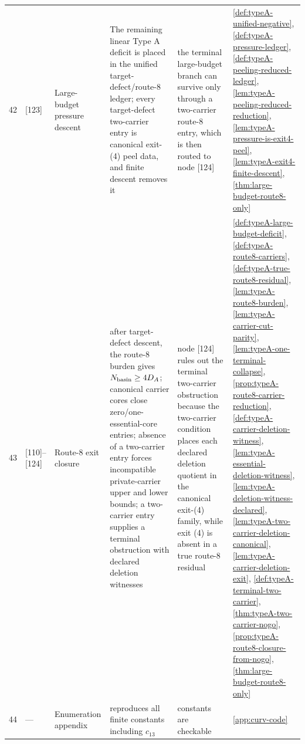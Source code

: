 \documentclass[11pt]{article}
\begin{document}
{\begin{longtable}{C{0.04\textwidth} L{0.13\textwidth} L{0.17\textwidth} L{0.25\textwidth} L{0.21\textwidth} L{0.12\textwidth}}
42 & [123] & Large-budget pressure descent & The remaining linear Type A deficit is placed in the unified target-defect/route-8 ledger; every target-defect two-carrier entry is canonical exit-(4) peel data, and finite descent removes it & the terminal large-budget branch can survive only through a two-carrier route-8 entry, which is then routed to node [124] & \cref{def:typeA-unified-negative}, \cref{def:typeA-pressure-ledger}, \cref{def:typeA-peeling-reduced-ledger}, \cref{lem:typeA-peeling-reduced-reduction}, \cref{lem:typeA-pressure-is-exit4-peel}, \cref{lem:typeA-exit4-finite-descent}, \cref{thm:large-budget-route8-only} \\
43 & [110]--[124] & Route-8 exit closure & after target-defect descent, the route-8 burden gives $N_{\rm basin}\ge4D_A$; canonical carrier cores close zero/one-essential-core entries; absence of a two-carrier entry forces incompatible private-carrier upper and lower bounds; a two-carrier entry supplies a terminal obstruction with declared deletion witnesses & node [124] rules out the terminal two-carrier obstruction because the two-carrier condition places each declared deletion quotient in the canonical exit-(4) family, while exit (4) is absent in a true route-8 residual & \cref{def:typeA-large-budget-deficit}, \cref{def:typeA-route8-carriers}, \cref{def:typeA-true-route8-residual}, \cref{lem:typeA-route8-burden}, \cref{lem:typeA-carrier-cut-parity}, \cref{lem:typeA-one-terminal-collapse}, \cref{prop:typeA-route8-carrier-reduction}, \cref{def:typeA-carrier-deletion-witness}, \cref{lem:typeA-essential-deletion-witness}, \cref{lem:typeA-deletion-witness-declared}, \cref{lem:typeA-two-carrier-deletion-canonical}, \cref{lem:typeA-carrier-deletion-exit}, \cref{def:typeA-terminal-two-carrier}, \cref{thm:typeA-two-carrier-nogo}, \cref{prop:typeA-route8-closure-from-nogo}, \cref{thm:large-budget-route8-only} \\
44 & --- & Enumeration appendix & reproduces all finite constants including $c_{13}$ & constants are checkable & \cref{app:curv-code} \\

\end{longtable}}
\end{document}
